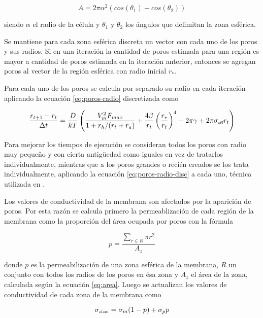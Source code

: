 \begin{equation} \label{eq:area}
	A = 2 \pi \alpha^2 (cos(\theta_1) - cos(\theta_2))
\end{equation}

siendo $\alpha$ el radio de la célula y $\theta_1$ y $\theta_2$ los ángulos que delimitan la zona esférica.

Se mantiene para cada zona esférica discreta un vector con cada uno de los poros y sus radios. Si en una iteración la cantidad de poros estimada para una región es mayor a cantidad de poros estimada en la iteración anterior, entonces se agregan poros al vector de la región esférica con radio inicial $r_*$.

Para cada uno de los poros se calcula por separado su radio en cada iteración aplicando la ecuación \ref{eq:poros-radio} discretizada como

\begin{equation} \label{eq:poros-radio-disc}
	\frac{r_{t+1} - r_t}{\Delta t} = \frac{D}{kT} \left( \frac{V_m^2 F_{max}}{1+r_h / (r_t+r_a)} + \frac{4 \beta}{r_t} \left(\frac{r_*}{r_t}\right)^4 - 2 \pi \gamma + 2 \pi \sigma_{\textrm{\tiny eff}} r_t \right)
\end{equation}

Para mejorar los tiempos de ejecución se consideran todos los poros con radio muy pequeño y con cierta antigüedad como iguales en vez de tratarlos individualmente, mientras que a los poros grandes o recién creados se los trata individualmente, aplicando la ecuación \ref{eq:poros-radio-disc} a cada uno, técnica utilizada en \cite{krass}.

Los valores de conductividad de la membrana son afectados por la aparición de poros. Por esta razón se calcula primero la permeablización de cada región de la membrana como la proporción del área ocupada por poros con la fórmula

\begin{equation} 
    p = \frac{ \sum\limits_{r \in R} \pi r^2 }{A_z}
\end{equation} 

donde $p$ es la permeabilización de una zona esférica de la membrana, $R$ un conjunto con todos los radios de los poros en ésa zona y $A_z$ el área de la zona, calculada según la ecuación \ref{eq:area}. Luego se actualizan los valores de conductividad de cada zona de la membrana como

\begin{equation} 
	\sigma_{\textrm{\tiny elem}} = \sigma_m (1 - p) + \sigma_p p
\end{equation} 


